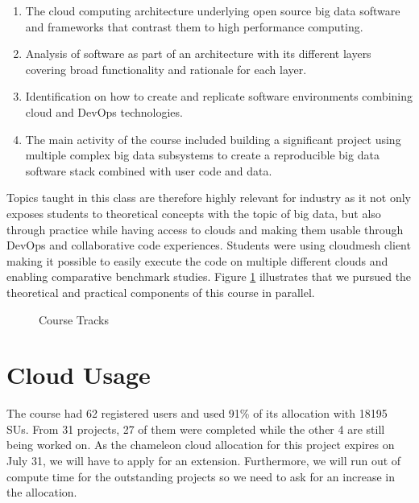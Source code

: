 \documentclass[sigconf]{acmart}
\begin{document}
\begin{enumerate}
\item The cloud computing architecture underlying open source big data
  software and frameworks that contrast them to high performance
  computing.
\item Analysis of software as part of an architecture with its
  different layers covering broad functionality and rationale for each
  layer.
\item Identification on how to create and replicate software
  environments combining cloud and DevOps technologies.
\item The main activity of the course included building a significant
  project using multiple complex big data subsystems to create a reproducible
  big data software stack combined with user code and data. 
\end{enumerate}

Topics taught in this class are therefore highly relevant for industry
as it not only exposes students to theoretical concepts with the topic
of big data, but also through practice while having access to clouds
and making them usable through DevOps and collaborative code
experiences. Students were using cloudmesh client
\cite{www-cloudmesh-client} making it possible to easily execute the code on
multiple different clouds and enabling comparative benchmark studies. Figure
\ref{F:course} illustrates that we pursued the theoretical and
practical components of this course in parallel.

\begin{figure}[htbp]
\centering
{}
\caption{Course Tracks}
\label{F:course}
\end{figure}


\section{Cloud Usage}

The course had 62 registered users and used 91\% of its allocation
with 18195 SUs.  From 31 projects, 27 of them were completed while the other
4 are still being worked on. As the chameleon cloud allocation for
this project expires on July 31, we will have to apply for an extension.
Furthermore, we will run out of compute time for the outstanding
projects so we need to ask for an increase in the allocation.
\end{document}

